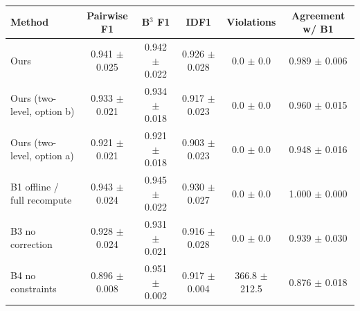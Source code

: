 \begin{tabular}{lccccc}
\toprule
Method & Pairwise F1 & B$^3$ F1 & IDF1 & Violations & Agreement w/ B1 \\
\midrule
Ours & 0.941 $\pm$ 0.025 & 0.942 $\pm$ 0.022 & 0.926 $\pm$ 0.028 & 0.0 $\pm$ 0.0 & 0.989 $\pm$ 0.006 \\
Ours (two-level, option b) & 0.933 $\pm$ 0.021 & 0.934 $\pm$ 0.018 & 0.917 $\pm$ 0.023 & 0.0 $\pm$ 0.0 & 0.960 $\pm$ 0.015 \\
Ours (two-level, option a) & 0.921 $\pm$ 0.021 & 0.921 $\pm$ 0.018 & 0.903 $\pm$ 0.023 & 0.0 $\pm$ 0.0 & 0.948 $\pm$ 0.016 \\
B1 offline / full recompute & 0.943 $\pm$ 0.024 & 0.945 $\pm$ 0.022 & 0.930 $\pm$ 0.027 & 0.0 $\pm$ 0.0 & 1.000 $\pm$ 0.000 \\
B3 no correction & 0.928 $\pm$ 0.024 & 0.931 $\pm$ 0.021 & 0.916 $\pm$ 0.028 & 0.0 $\pm$ 0.0 & 0.939 $\pm$ 0.030 \\
B4 no constraints & 0.896 $\pm$ 0.008 & 0.951 $\pm$ 0.002 & 0.917 $\pm$ 0.004 & 366.8 $\pm$ 212.5 & 0.876 $\pm$ 0.018 \\
\bottomrule
\end{tabular}
